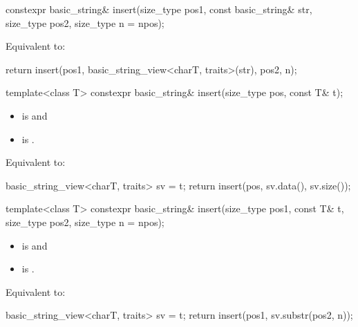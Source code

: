 %
\begin{itemdecl}
constexpr basic_string& insert(size_type pos1, const basic_string& str,
                               size_type pos2, size_type n = npos);
\end{itemdecl}

\begin{itemdescr}
\pnum
\effects
Equivalent to:
\begin{codeblock}
return insert(pos1, basic_string_view<charT, traits>(str), pos2, n);
\end{codeblock}
\end{itemdescr}

%
\begin{itemdecl}
template<class T>
  constexpr basic_string& insert(size_type pos, const T& t);
\end{itemdecl}

\begin{itemdescr}
\pnum
\constraints
\begin{itemize}
\item
{} is
 and
\item
{} is
.
\end{itemize}

\pnum
\effects
Equivalent to:
\begin{codeblock}
basic_string_view<charT, traits> sv = t;
return insert(pos, sv.data(), sv.size());
\end{codeblock}
\end{itemdescr}

%
\begin{itemdecl}
template<class T>
  constexpr basic_string& insert(size_type pos1, const T& t,
                                 size_type pos2, size_type n = npos);
\end{itemdecl}

\begin{itemdescr}
\pnum
\constraints
\begin{itemize}
\item
{} is
 and
\item
{} is
.
\end{itemize}

\pnum
\effects
Equivalent to:
\begin{codeblock}
basic_string_view<charT, traits> sv = t;
return insert(pos1, sv.substr(pos2, n));
\end{codeblock}
\end{itemdescr}

